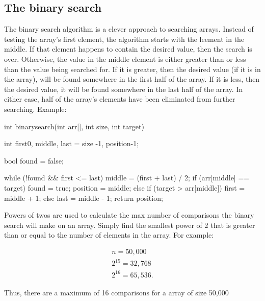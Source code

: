 \documentclass{report}
\begin{document}
    \subsection{The binary search}
    \bigbreak \noindent 
    The binary search algorithm is a clever approach to searching arrays. Instead of testing the array's first element, the algorithm starts with the leement in the middle. If that element happens to contain the desired value, then the search is over. Otherwise, the value in the middle element is either greater than or less than the value being searched for. If it is greater, then the desired value (if it is in the array), will be found somewhere in the first half of the array. If it is less, then the desired value, it will be found somewhere in the last half of the array. In either case, half of the array's elements have been eliminated from further searching.
    \bigbreak \noindent 
    \bigbreak \noindent 
    Example:
    \bigbreak \noindent 
    
    \begin{cppcode}
int binarysearch(int arr[], int size, int target) {
    int first{0}, 
        middle,
        last = size -1,
        position{-1};

    bool found = false;

    while (!found && first <= last) {
        middle = (first + last) / 2;
        if (arr[middle] == target) {
            found = true;
            position = middle;
        } else if (target > arr[middle]) {
            first = middle + 1;
        } else {
            last = middle - 1;
        }
    }
    return position;
}
    \end{cppcode}
    
    \bigbreak \noindent 
    Powers of twos are used to calculate the max number of comparisons the binary search will make on an array. Simply find the smallest power of 2 that is greater than or equal to the number of elements in the array. For example:
    \bigbreak \noindent 
    \begin{minipage}[]{0.47\textwidth}
    \begin{align*}
        n = 50,000 \\
        2^{15} = 32,768 \\
        2^{16} = 65,536
    .\end{align*}
    \end{minipage}
    \begin{minipage}[t]{0.47\textwidth}
        Thus, there are a maximum of 16 comparisons for a array of size 50,000
    \end{minipage}
\end{document}
